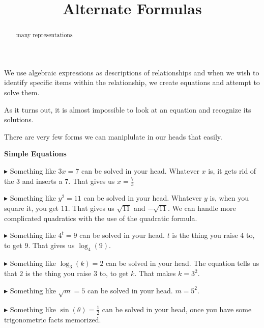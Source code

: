 \documentclass{ximera}
\title{Alternate Formulas}
\begin{document}
\begin{abstract}
many representations
\end{abstract}
\maketitle





We use algebraic expressions as descriptions of relationships and when we wish to identify specific items within the relationship, we create equations and attempt to solve them.

As it turns out, it is almost impossible to look at an equation and recognize its solutions.


There are very few forms we can maniplulate in our heads that easily.



\begin{summary} \textbf{\textcolor{blue!75!black}{Simple Equations}} 

$\blacktriangleright$ Something like $3x = 7$ can be solved in your head.  Whatever $x$ is, it gets rid of the $3$ and inserts a $7$.  That gives us $x =\frac{7}{3}$





$\blacktriangleright$ Something like $y^2 = 11$ can be solved in your head.  Whatever $y$ is, when you square it, you get $11$.  That gives us $\sqrt{11}$ and $-\sqrt{11}$.  We can handle more complicated  quadratics with the use of the quadratic formula.




$\blacktriangleright$ Something like $4^t = 9$ can be solved in your head.  $t$ is the thing you raise $4$ to, to get $9$.  That gives us $\log_4(9)$.



$\blacktriangleright$ Something like $\log_3(k) = 2$ can be solved in your head.  The equation tells us that $2$ is the thing you raise $3$ to, to get $k$.  That makes $k = 3^2$.



$\blacktriangleright$ Something like $\sqrt{m} = 5$ can be solved in your head.  $m = 5^2$.


$\blacktriangleright$ Something like $\sin(\theta) = \frac{1}{2}$ can be solved in your head, once you have some trigonometric facts memorized.


\end{summary}
\end{document}
